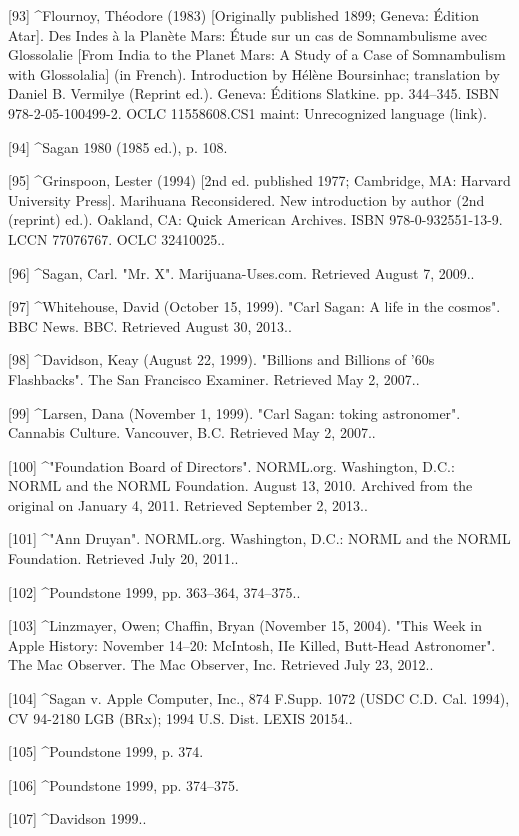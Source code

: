 [93]
^Flournoy, Théodore (1983) [Originally published 1899; Geneva: Édition Atar]. Des Indes à la Planète Mars: Étude sur un cas de Somnambulisme avec Glossolalie [From India to the Planet Mars: A Study of a Case of Somnambulism with Glossolalia] (in French). Introduction by Hélène Boursinhac; translation by Daniel B. Vermilye (Reprint ed.). Geneva: Éditions Slatkine. pp. 344–345. ISBN 978-2-05-100499-2. OCLC 11558608.CS1 maint: Unrecognized language (link).

[94]
^Sagan 1980 (1985 ed.), p. 108.

[95]
^Grinspoon, Lester (1994) [2nd ed. published 1977; Cambridge, MA: Harvard University Press]. Marihuana Reconsidered. New introduction by author (2nd (reprint) ed.). Oakland, CA: Quick American Archives. ISBN 978-0-932551-13-9. LCCN 77076767. OCLC 32410025..

[96]
^Sagan, Carl. "Mr. X". Marijuana-Uses.com. Retrieved August 7, 2009..

[97]
^Whitehouse, David (October 15, 1999). "Carl Sagan: A life in the cosmos". BBC News. BBC. Retrieved August 30, 2013..

[98]
^Davidson, Keay (August 22, 1999). "Billions and Billions of '60s Flashbacks". The San Francisco Examiner. Retrieved May 2, 2007..

[99]
^Larsen, Dana (November 1, 1999). "Carl Sagan: toking astronomer". Cannabis Culture. Vancouver, B.C. Retrieved May 2, 2007..

[100]
^"Foundation Board of Directors". NORML.org. Washington, D.C.: NORML and the NORML Foundation. August 13, 2010. Archived from the original on January 4, 2011. Retrieved September 2, 2013..

[101]
^"Ann Druyan". NORML.org. Washington, D.C.: NORML and the NORML Foundation. Retrieved July 20, 2011..

[102]
^Poundstone 1999, pp. 363–364, 374–375..

[103]
^Linzmayer, Owen; Chaffin, Bryan (November 15, 2004). "This Week in Apple History: November 14–20: McIntosh, IIe Killed, Butt-Head Astronomer". The Mac Observer. The Mac Observer, Inc. Retrieved July 23, 2012..

[104]
^Sagan v. Apple Computer, Inc., 874 F.Supp. 1072 (USDC C.D. Cal. 1994), CV 94-2180 LGB (BRx); 1994 U.S. Dist. LEXIS 20154..

[105]
^Poundstone 1999, p. 374.

[106]
^Poundstone 1999, pp. 374–375.

[107]
^Davidson 1999..

